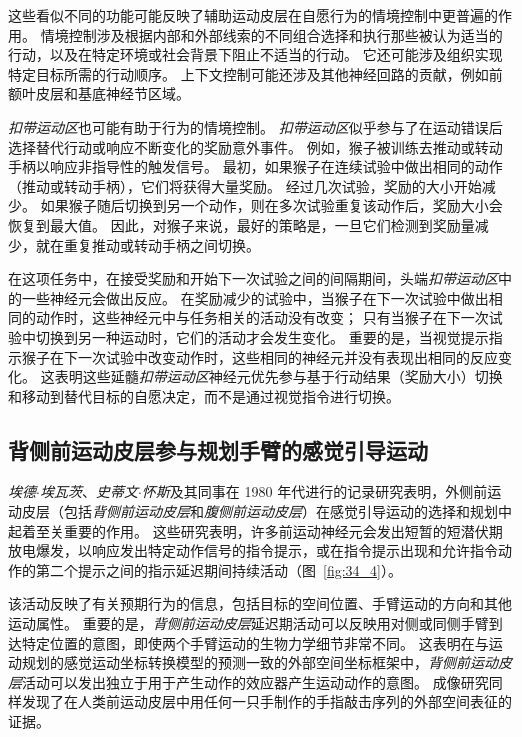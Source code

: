 这些看似不同的功能可能反映了辅助运动皮层在自愿行为的情境控制中更普遍的作用。
情境控制涉及根据内部和外部线索的不同组合选择和执行那些被认为适当的行动，以及在特定环境或社会背景下阻止不适当的行动。
它还可能涉及组织实现特定目标所需的行动顺序。
上下文控制可能还涉及其他神经回路的贡献，例如前额叶皮层和基底神经节区域。


\textit{扣带运动区}也可能有助于行为的情境控制。
\textit{扣带运动区}似乎参与了在运动错误后选择替代行动或响应不断变化的奖励意外事件。
例如，猴子被训练去推动或转动手柄以响应非指导性的触发信号。
最初，如果猴子在连续试验中做出相同的动作（推动或转动手柄），它们将获得大量奖励。
经过几次试验，奖励的大小开始减少。
如果猴子随后切换到另一个动作，则在多次试验重复该动作后，奖励大小会恢复到最大值。
因此，对猴子来说，最好的策略是，一旦它们检测到奖励量减少，就在重复推动或转动手柄之间切换。


在这项任务中，在接受奖励和开始下一次试验之间的间隔期间，头端\textit{扣带运动区}中的一些神经元会做出反应。
在奖励减少的试验中，当猴子在下一次试验中做出相同的动作时，这些神经元中与任务相关的活动没有改变；
只有当猴子在下一次试验中切换到另一种运动时，它们的活动才会发生变化。
重要的是，当视觉提示指示猴子在下一次试验中改变动作时，这些相同的神经元并没有表现出相同的反应变化。
这表明这些延髓\textit{扣带运动区}神经元优先参与基于行动结果（奖励大小）切换和移动到替代目标的自愿决定，而不是通过视觉指令进行切换。



\subsection{背侧前运动皮层参与规划手臂的感觉引导运动}

\textit{埃德$\cdot$埃瓦茨}、\textit{史蒂文$\cdot$怀斯}及其同事在 1980 年代进行的记录研究表明，外侧前运动皮层（包括\textit{背侧前运动皮层}和\textit{腹侧前运动皮层}）在感觉引导运动的选择和规划中起着至关重要的作用。
这些研究表明，许多前运动神经元会发出短暂的短潜伏期放电爆发，以响应发出特定动作信号的指令提示，或在指令提示出现和允许指令动作的第二个提示之间的指示延迟期间持续活动（图~\ref{fig:34_4}）。


该活动反映了有关预期行为的信息，包括目标的空间位置、手臂运动的方向和其他运动属性。
重要的是，\textit{背侧前运动皮层}延迟期活动可以反映用对侧或同侧手臂到达特定位置的意图，即使两个手臂运动的生物力学细节非常不同。
这表明在与运动规划的感觉运动坐标转换模型的预测一致的外部空间坐标框架中，\textit{背侧前运动皮层}活动可以发出独立于用于产生动作的效应器产生运动动作的意图。
成像研究同样发现了在人类前运动皮层中用任何一只手制作的手指敲击序列的外部空间表征的证据。


